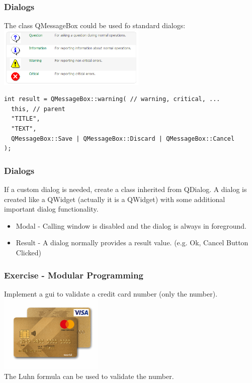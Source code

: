 \begin{frame}[fragile]
\frametitle{Dialogs}
The class QMessageBox could be used fo standard dialogs:
\vspace{3mm}
\includegraphics[width=200pt]{img/messagebox.png}
{\tiny
\begin{lstlisting}
int result = QMessageBox::warning( // warning, critical, ...
  this, // parent
  "TITLE",
  "TEXT",
  QMessageBox::Save | QMessageBox::Discard | QMessageBox::Cancel
);
\end{lstlisting}
}
\end{frame}

\begin{frame}[fragile]
\frametitle{Dialogs}
If a custom dialog is needed, create a class inherited from QDialog.
A dialog is created like a QWidget (actually it is a QWidget) with
some additional important dialog functionality.
\begin{itemize}
\item Modal - Calling window is disabled and the dialog is always in foreground.
\item Result - A dialog normally provides a result value.
(e.g. Ok, Cancel Button Clicked)
\end{itemize}
\end{frame}

\begin{frame}[fragile]
	\frametitle{Exercise - Modular Programming}
	\begin{exercise}
  Implement a gui to validate a credit card number (only the number).\\
  \includegraphics[width=140pt]{img/creditcard.png}\\
  The Luhn formula can be used to validate the number.
	\end{exercise}
\end{frame}


